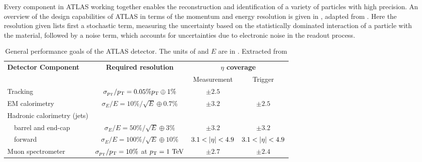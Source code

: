 Every component in \ac{ATLAS} working together enables the reconstruction and identification of a variety of particles with high precision. An overview of the design capabilities of \ac{ATLAS} in terms of the momentum and energy resolution is given in \Tab{\ref{tab:atlas:atlas:expected_performance}}, adapted from .
Here the resolution given lists first a stochastic term, measuring the uncertainty based on the statistically dominated interaction of a particle with the material, followed by a noise term, which accounts for uncertainties due to electronic noise in the readout process. 


\begin{table}[ht!]
    \caption{General performance goals of the \ac{ATLAS} detector. The units of \pt and \(E\) are in \gev. Extracted from }
    \begin{tabular}{|l|c|c|c|}
        \hline
        \multirow{2}{*}{\textbf{Detector Component}}    & \multirow{2}{*}{\textbf{Required resolution}}     & \multicolumn{2}{c|}{\textbf{$\eta$ coverage}}             \\\cline{3-4} 
                                                        &                                                   & Measurement              & Trigger                        \\ \hline
        Tracking                                        & \( \sigma_{p_{\text{T}}}/p_{\text{T}} = 0.05\%p_{\text{T}} \oplus 1\%    \)  & \( \pm 2.5 \)            &                                \\ \hline
        EM calorimetry                                  & \( \sigma_{E}/E = 10\%/\sqrt{E} \oplus 0.7\%  \)  & \( \pm 3.2 \)            & \( \pm 2.5 \)                  \\ \hline
        Hadronic calorimetry (jets)                     &                                                   &                          &                                \\
        $\quad$barrel and end-cap                       & \( \sigma_{E}/E = 50\%/\sqrt{E} \oplus 3\%    \)  & \( \pm 3.2 \)            & \( \pm 3.2 \)                  \\
        $\quad$forward                                  & \( \sigma_{E}/E = 100\%/\sqrt{E} \oplus 10\%  \)  & \( 3.1 < |\eta|< 4.9 \) & \( 3.1 < |\eta|< 4.9 \)       \\ \hline
        Muon spectrometer                               & \( \sigma_{p_{\text{T}}}/p_{\text{T}} = 10\%\) at \(p_{\text{T}} =1~\text{TeV} \)  & \( \pm 2.7 \)            & \( \pm 2.4 \)                  \\
        \hline
    \end{tabular}
    \label{tab:atlas:atlas:expected_performance}
\end{table}

